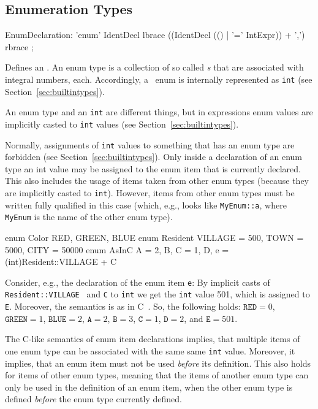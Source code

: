 \subsection{Enumeration Types}
\begin{rail}
  EnumDeclaration: 'enum' IdentDecl lbrace ((IdentDecl (() | '=' IntExpr)) + ',') rbrace ;
\end{rail}
Defines an .
An enum type is a collection of so called \emph{s} that are associated with integral numbers, each.
Accordingly, a \GrG\ enum is internally represented as \texttt{int} (see Section~\ref{sec:builtintypes}).
\begin{note}
	An enum type and an {\tt int} are different things, but in expressions enum values are implicitly casted to {\tt int} values 	(see Section~\ref{sec:builtintypes}).
\end{note}
\begin{warning}
	Normally, assignments of {\tt int} values to something that has an enum type are forbidden (see Section~\ref{sec:builtintypes}).
	Only inside a declaration of an enum type an int value may be assigned to the enum item that is currently declared.
	This also includes the usage of items taken from other enum types (because they are implicitly casted to {\tt int}).
	However, items from other enum types must be written fully qualified in this case (which, e.g., looks like {\tt MyEnum::a}, where {\tt MyEnum} is the name of the other enum type).
\end{warning}

\begin{example}
\begin{grgen}
enum Color {RED, GREEN, BLUE}
enum Resident {VILLAGE = 500, TOWN = 5000, CITY = 50000}
enum AsInC {A = 2, B, C = 1, D, e = (int)Resident::VILLAGE + C}
\end{grgen}
Consider, e.g., the declaration of the enum item {\tt e}:
By implicit casts of   {\tt Resident::VILLAGE } and {\tt C} to {\tt int} we get the {\tt int} value 501, which is assigned to {\tt E}.
Moreover, the semantics is as in C~\cite{Sch:1990:ANSIC}. So, the following holds: $\texttt{RED} = 0$, $\texttt{GREEN} = 1$, $\texttt{BLUE} = 2$, $\texttt{A}=2$, $\texttt{B}=3$, $\texttt{C}=1$, $\texttt{D}=2$, and $\texttt{E}=501$.
\end{example}
\begin{note}
	The C-like semantics of enum item declarations implies, that multiple items of one enum type can be associated with the same same {\tt int} value.
	Moreover, it implies, that an enum item must not be used \emph{before} its definition.
	This also holds for items of other enum types, meaning that the items of another enum type can only be used in the definition of an enum item, when the other enum type is defined \emph{before} the enum type currently defined.
\end{note}

